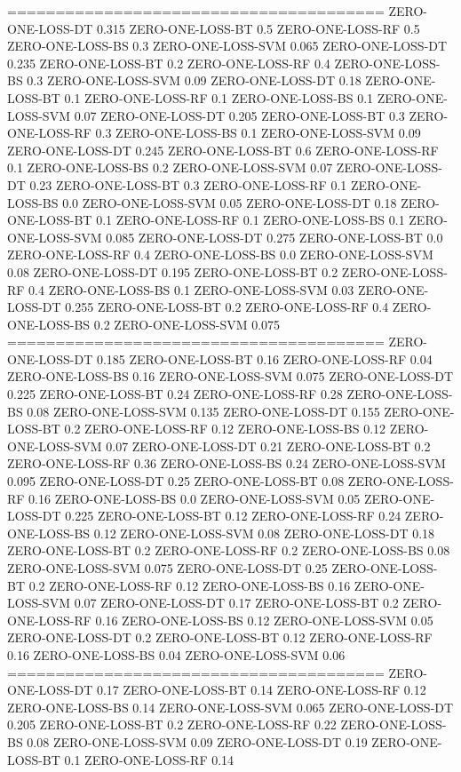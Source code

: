 \documentclass[12pt]{article}
\begin{document}
=======================================
ZERO-ONE-LOSS-DT 0.315
ZERO-ONE-LOSS-BT 0.5
ZERO-ONE-LOSS-RF 0.5
ZERO-ONE-LOSS-BS 0.3
ZERO-ONE-LOSS-SVM 0.065
ZERO-ONE-LOSS-DT 0.235
ZERO-ONE-LOSS-BT 0.2
ZERO-ONE-LOSS-RF 0.4
ZERO-ONE-LOSS-BS 0.3
ZERO-ONE-LOSS-SVM 0.09
ZERO-ONE-LOSS-DT 0.18
ZERO-ONE-LOSS-BT 0.1
ZERO-ONE-LOSS-RF 0.1
ZERO-ONE-LOSS-BS 0.1
ZERO-ONE-LOSS-SVM 0.07
ZERO-ONE-LOSS-DT 0.205
ZERO-ONE-LOSS-BT 0.3
ZERO-ONE-LOSS-RF 0.3
ZERO-ONE-LOSS-BS 0.1
ZERO-ONE-LOSS-SVM 0.09
ZERO-ONE-LOSS-DT 0.245
ZERO-ONE-LOSS-BT 0.6
ZERO-ONE-LOSS-RF 0.1
ZERO-ONE-LOSS-BS 0.2
ZERO-ONE-LOSS-SVM 0.07
ZERO-ONE-LOSS-DT 0.23
ZERO-ONE-LOSS-BT 0.3
ZERO-ONE-LOSS-RF 0.1
ZERO-ONE-LOSS-BS 0.0
ZERO-ONE-LOSS-SVM 0.05
ZERO-ONE-LOSS-DT 0.18
ZERO-ONE-LOSS-BT 0.1
ZERO-ONE-LOSS-RF 0.1
ZERO-ONE-LOSS-BS 0.1
ZERO-ONE-LOSS-SVM 0.085
ZERO-ONE-LOSS-DT 0.275
ZERO-ONE-LOSS-BT 0.0
ZERO-ONE-LOSS-RF 0.4
ZERO-ONE-LOSS-BS 0.0
ZERO-ONE-LOSS-SVM 0.08
ZERO-ONE-LOSS-DT 0.195
ZERO-ONE-LOSS-BT 0.2
ZERO-ONE-LOSS-RF 0.4
ZERO-ONE-LOSS-BS 0.1
ZERO-ONE-LOSS-SVM 0.03
ZERO-ONE-LOSS-DT 0.255
ZERO-ONE-LOSS-BT 0.2
ZERO-ONE-LOSS-RF 0.4
ZERO-ONE-LOSS-BS 0.2
ZERO-ONE-LOSS-SVM 0.075
=======================================
ZERO-ONE-LOSS-DT 0.185
ZERO-ONE-LOSS-BT 0.16
ZERO-ONE-LOSS-RF 0.04
ZERO-ONE-LOSS-BS 0.16
ZERO-ONE-LOSS-SVM 0.075
ZERO-ONE-LOSS-DT 0.225
ZERO-ONE-LOSS-BT 0.24
ZERO-ONE-LOSS-RF 0.28
ZERO-ONE-LOSS-BS 0.08
ZERO-ONE-LOSS-SVM 0.135
ZERO-ONE-LOSS-DT 0.155
ZERO-ONE-LOSS-BT 0.2
ZERO-ONE-LOSS-RF 0.12
ZERO-ONE-LOSS-BS 0.12
ZERO-ONE-LOSS-SVM 0.07
ZERO-ONE-LOSS-DT 0.21
ZERO-ONE-LOSS-BT 0.2
ZERO-ONE-LOSS-RF 0.36
ZERO-ONE-LOSS-BS 0.24
ZERO-ONE-LOSS-SVM 0.095
ZERO-ONE-LOSS-DT 0.25
ZERO-ONE-LOSS-BT 0.08
ZERO-ONE-LOSS-RF 0.16
ZERO-ONE-LOSS-BS 0.0
ZERO-ONE-LOSS-SVM 0.05
ZERO-ONE-LOSS-DT 0.225
ZERO-ONE-LOSS-BT 0.12
ZERO-ONE-LOSS-RF 0.24
ZERO-ONE-LOSS-BS 0.12
ZERO-ONE-LOSS-SVM 0.08
ZERO-ONE-LOSS-DT 0.18
ZERO-ONE-LOSS-BT 0.2
ZERO-ONE-LOSS-RF 0.2
ZERO-ONE-LOSS-BS 0.08
ZERO-ONE-LOSS-SVM 0.075
ZERO-ONE-LOSS-DT 0.25
ZERO-ONE-LOSS-BT 0.2
ZERO-ONE-LOSS-RF 0.12
ZERO-ONE-LOSS-BS 0.16
ZERO-ONE-LOSS-SVM 0.07
ZERO-ONE-LOSS-DT 0.17
ZERO-ONE-LOSS-BT 0.2
ZERO-ONE-LOSS-RF 0.16
ZERO-ONE-LOSS-BS 0.12
ZERO-ONE-LOSS-SVM 0.05
ZERO-ONE-LOSS-DT 0.2
ZERO-ONE-LOSS-BT 0.12
ZERO-ONE-LOSS-RF 0.16
ZERO-ONE-LOSS-BS 0.04
ZERO-ONE-LOSS-SVM 0.06
=======================================
ZERO-ONE-LOSS-DT 0.17
ZERO-ONE-LOSS-BT 0.14
ZERO-ONE-LOSS-RF 0.12
ZERO-ONE-LOSS-BS 0.14
ZERO-ONE-LOSS-SVM 0.065
ZERO-ONE-LOSS-DT 0.205
ZERO-ONE-LOSS-BT 0.2
ZERO-ONE-LOSS-RF 0.22
ZERO-ONE-LOSS-BS 0.08
ZERO-ONE-LOSS-SVM 0.09
ZERO-ONE-LOSS-DT 0.19
ZERO-ONE-LOSS-BT 0.1
ZERO-ONE-LOSS-RF 0.14
\end{document}
